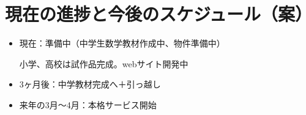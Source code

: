 ﻿\documentclass[12pt]{article}
\begin{document}
\section{現在の進捗と今後のスケジュール（案）}
\begin{itemize}[leftmargin=1.5em, parsep=4pt]
  \item 現在：準備中（中学生数学教材作成中、物件準備中）
    
  小学、高校は試作品完成。webサイト開発中
  
  \item 3ヶ月後：中学教材完成へ＋引っ越し
  \item 来年の3月～4月：本格サービス開始
\end{itemize}

\end{document}
